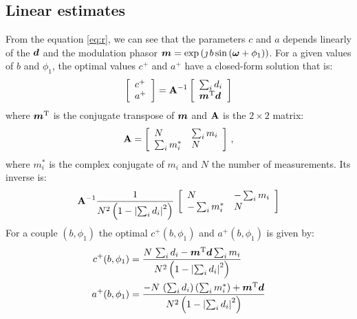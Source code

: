 \documentclass[a4paper,11pt,twoside]{scrartcl}
\begin{document}
\subsection{Linear estimates}
From the equation \ref{eq:r}, we can see that the parameters  $c$ and $a$ depends linearly of the  $\boldsymbol{d}$ and the modulation phasor $\boldsymbol{m} = \exp\left( \jmath \, b \sin\left( \boldsymbol{\omega} + \phi_1\right)\right)$. For a given values of $b$ and $\phi_1$, the optimal values $c^+$ and $a^+$ have a closed-form solution that is:
\begin{equation}
    \left[\begin{array}{l}
    c^+\\
    a^+
    \end{array}\right] = \mathbf{A}^{-1} 
    \left[\begin{array}{l}
    \sum_i d_i\\
    \boldsymbol{m}^{\mathrm{T}}\boldsymbol{d}
    \end{array}\right] 
\end{equation}
where $\boldsymbol{m}^{\mathrm{T}}$ is the conjugate transpose of $\boldsymbol{m}$ and $\mathbf{A}$ is the $2\times2$ matrix:
\begin{equation}
    \mathbf{A} = \left[\begin{array}{ll}
    N & \sum_i m_i\\
    \sum_i  m_i^* & N
    \end{array}\right] \,,
\end{equation}
where $m_i^*$ is the complex conjugate of $m_i$ and $N$  the number of measurements. Its inverse is:
\begin{equation}
   \mathbf{A}^{-1} \frac{1}{N^2 \left(1 - \left\vert  \sum_i d_i\right\vert^2\right)}\,\left[\begin{array}{ll}
    N & - \sum_i m_i\\
    - \sum_i  m_i^* & N
    \end{array}\right] 
\end{equation}
For a couple $(b,\phi_1)$ the optimal $c^+(b,\phi_1)$ and $a^+(b,\phi_1)$ is given by:
\begin{align}
    c^+(b,\phi_1) &= \frac{N\,\sum_i d_i - \boldsymbol{m}^{\mathrm{T}}\boldsymbol{d}\sum_i m_i}{N^2 \left(1 - \left\vert  \sum_i d_i\right\vert^2\right)}\\
    a^+(b,\phi_1) &= \frac{ -N\,\left(\sum_i d_i\right)  \left(\sum_i  m_i^*\right)+ \boldsymbol{m}^{\mathrm{T}}\boldsymbol{d}}{N^2 \left(1 - \left\vert  \sum_i d_i\right\vert^2\right)}
\end{align}
\end{document}
